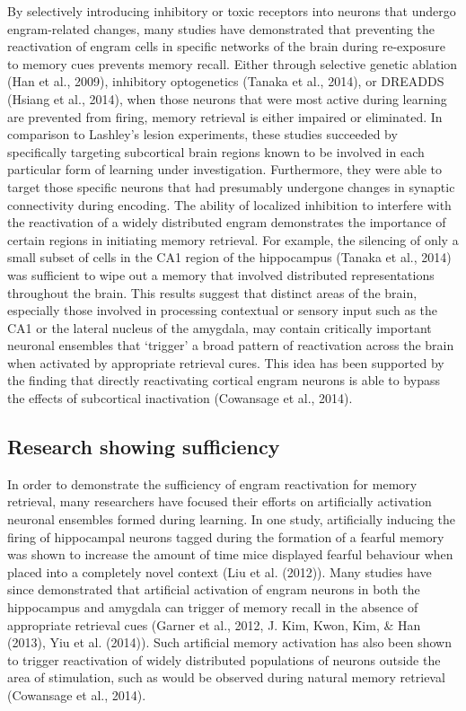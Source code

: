 \documentclass[12pt,a4paper,]{report}
\begin{document}
By selectively introducing inhibitory or toxic receptors into neurons
that undergo engram-related changes, many studies have demonstrated that
preventing the reactivation of engram cells in specific networks of the
brain during re-exposure to memory cues prevents memory recall. Either
through selective genetic ablation (Han et al., 2009), inhibitory
optogenetics (Tanaka et al., 2014), or DREADDS (Hsiang et al., 2014),
when those neurons that were most active during learning are prevented
from firing, memory retrieval is either impaired or eliminated. In
comparison to Lashley's lesion experiments, these studies succeeded by
specifically targeting subcortical brain regions known to be involved in
each particular form of learning under investigation. Furthermore, they
were able to target those specific neurons that had presumably undergone
changes in synaptic connectivity during encoding. The ability of
localized inhibition to interfere with the reactivation of a widely
distributed engram demonstrates the importance of certain regions in
initiating memory retrieval. For example, the silencing of only a small
subset of cells in the CA1 region of the hippocampus (Tanaka et al.,
2014) was sufficient to wipe out a memory that involved distributed
representations throughout the brain. This results suggest that distinct
areas of the brain, especially those involved in processing contextual
or sensory input such as the CA1 or the lateral nucleus of the amygdala,
may contain critically important neuronal ensembles that `trigger' a
broad pattern of reactivation across the brain when activated by
appropriate retrieval cures. This idea has been supported by the finding
that directly reactivating cortical engram neurons is able to bypass the
effects of subcortical inactivation (Cowansage et al., 2014).

\subsection{Research showing
sufficiency}\label{research-showing-sufficiency}

In order to demonstrate the sufficiency of engram reactivation for
memory retrieval, many researchers have focused their efforts on
artificially activation neuronal ensembles formed during learning. In
one study, artificially inducing the firing of hippocampal neurons
tagged during the formation of a fearful memory was shown to increase
the amount of time mice displayed fearful behaviour when placed into a
completely novel context (Liu et al. (2012)). Many studies have since
demonstrated that artificial activation of engram neurons in both the
hippocampus and amygdala can trigger of memory recall in the absence of
appropriate retrieval cues (Garner et al., 2012, J. Kim, Kwon, Kim, \&
Han (2013), Yiu et al. (2014)). Such artificial memory activation has
also been shown to trigger reactivation of widely distributed
populations of neurons outside the area of stimulation, such as would be
observed during natural memory retrieval (Cowansage et al., 2014).
\end{document}
